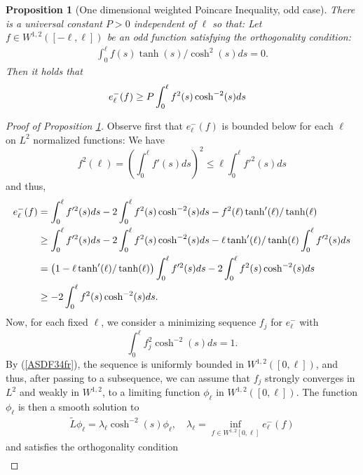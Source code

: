 \documentclass[10pt,a4paper]{amsart}
\newtheorem{proposition}{Proposition}
\newcommand{\wt}{\widetilde}
\begin{document}
\begin{proposition}[One dimensional weighted Poincare Inequality, odd case] \label{PoincareInequality}
There is a universal constant  $P > 0$ independent of $\ell$ so that: Let $f \in W^{1, 2}([-\ell, \ell])$  be an odd function satisfying the orthogonality condition:
\begin{align} \label{WeightedOrthogonalityCondition}
\int_0^\ell f (s)\tanh(s)/\cosh^2(s) ds = 0.
\end{align}
Then it holds that 
\begin{align} \notag
e^{-}_\ell(f) & \geq P \int_0^\ell f^2(s) \cosh^{-2} (s)ds
\end{align}
\end{proposition}

\begin{proof}[Proof of Proposition \ref{PoincareInequality}]
Observe first that  $e^{-}_\ell(f)$ is bounded below for each $\ell$ on $L^2$ normalized functions: We have
\[
f^2(\ell) = \left( \int_{0}^\ell f'(s) ds\right)^2 \leq \ell \int_{0}^\ell f'^2(s) ds
\]
and thus, 
\begin{align}\label{ASDF34fr}
e^{-}_\ell(f) & = \int_0^\ell f'^2 (s) ds - 2 \int_0^\ell f^2(s) \cosh^{-2} (s) ds - f^2 (\ell) \tanh'(\ell)/\tanh(\ell) \\ \notag
& \geq \int_0^\ell f'^2 (s) ds - 2 \int_0^\ell f^2(s) \cosh^{-2} (s) ds - \ell \tanh'(\ell)/\tanh(\ell) \int_0^\ell f'^2 (s) ds \\ \notag
& = \left (1 -  \ell \tanh'(\ell)/\tanh(\ell) \right) \int_{0}^\ell f'^2(s) ds- 2 \int_0^\ell f^2(s) \cosh^{-2} (s) ds  \\ \notag
& \geq - 2 \int_0^\ell f^2(s) \cosh^{-2} (s) ds .
\end{align}
Now, for  each fixed $\ell$, we consider a minimizing sequence $f_j$ for $e^{-}_\ell$ with
\[
\int_0^\ell f^2_j \cosh^{-2} (s) ds = 1.
\]
 By  (\ref{ASDF34fr}), the sequence is uniformly bounded in $W^{1, 2}\left([0, \ell]\right)$, and thus, after passing to a subsequence, we can assume that $f_j$  strongly  converges in $L^2$ and weakly in $W^{1, 2}$,  to a limiting function $\phi_{\ell}$ in $W^{1, 2}([0, \ell])$. The function $\phi_\ell$ is then  a smooth solution to
 \begin{align}\label{eigen}
 \wt{L} \phi_\ell= \lambda_{\ell} \cosh^{-2}(s)\phi_{\ell}, \quad \lambda_{\ell} = \inf_{f \in W^{1, 2}[0, \ell]} e^{-}_\ell(f)
 \end{align} 
and  satisfies the orthogonality condition 
\begin{align}\label{orthco}

\end{align}
\end{proof}
\end{document}
